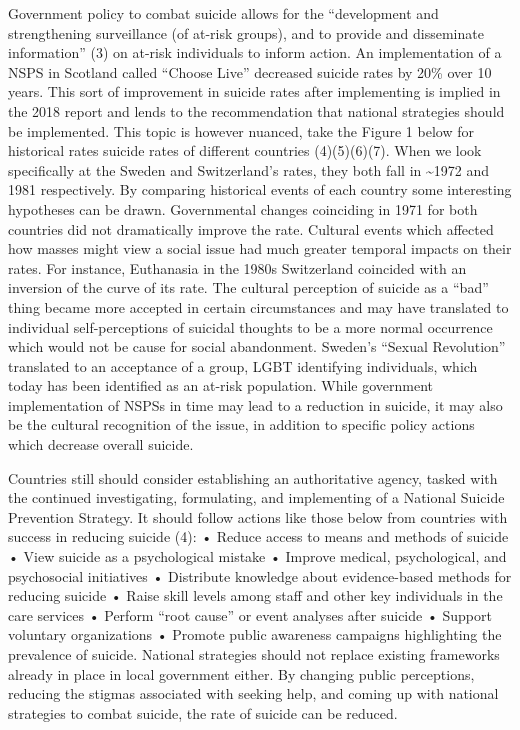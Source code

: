 \documentclass[]{article}
\begin{document}
Government policy to combat suicide allows for the ``development and
strengthening surveillance (of at-risk groups), and to provide and
disseminate information'' (3) on at-risk individuals to inform action.
An implementation of a NSPS in Scotland called ``Choose Live'' decreased
suicide rates by 20\% over 10 years. This sort of improvement in suicide
rates after implementing is implied in the 2018 report and lends to the
recommendation that national strategies should be implemented. This
topic is however nuanced, take the Figure 1 below for historical rates
suicide rates of different countries (4)(5)(6)(7). When we look
specifically at the Sweden and Switzerland's rates, they both fall in
\textasciitilde{}1972 and 1981 respectively. By comparing historical
events of each country some interesting hypotheses can be drawn.
Governmental changes coinciding in 1971 for both countries did not
dramatically improve the rate. Cultural events which affected how masses
might view a social issue had much greater temporal impacts on their
rates. For instance, Euthanasia in the 1980s Switzerland coincided with
an inversion of the curve of its rate. The cultural perception of
suicide as a ``bad'' thing became more accepted in certain circumstances
and may have translated to individual self-perceptions of suicidal
thoughts to be a more normal occurrence which would not be cause for
social abandonment. Sweden's ``Sexual Revolution'' translated to an
acceptance of a group, LGBT identifying individuals, which today has
been identified as an at-risk population. While government
implementation of NSPSs in time may lead to a reduction in suicide, it
may also be the cultural recognition of the issue, in addition to
specific policy actions which decrease overall suicide.

Countries still should consider establishing an authoritative agency,
tasked with the continued investigating, formulating, and implementing
of a National Suicide Prevention Strategy. It should follow actions like
those below from countries with success in reducing suicide (4): •
Reduce access to means and methods of suicide • View suicide as a
psychological mistake • Improve medical, psychological, and psychosocial
initiatives • Distribute knowledge about evidence-based methods for
reducing suicide • Raise skill levels among staff and other key
individuals in the care services • Perform ``root cause'' or event
analyses after suicide • Support voluntary organizations • Promote
public awareness campaigns highlighting the prevalence of suicide.
National strategies should not replace existing frameworks already in
place in local government either. By changing public perceptions,
reducing the stigmas associated with seeking help, and coming up with
national strategies to combat suicide, the rate of suicide can be
reduced.
\end{document}
